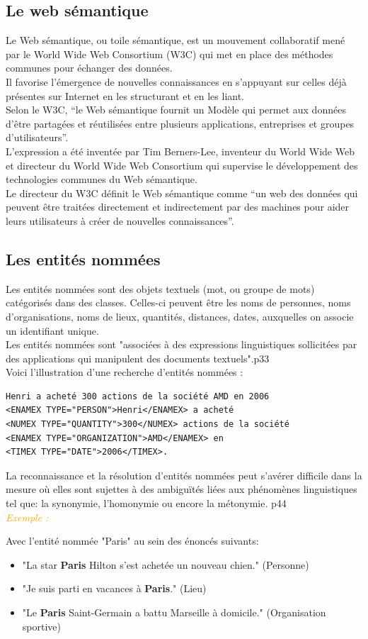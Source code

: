 \documentclass[a4paper, 11pt]{report}
\newenvironment{exemple}
    {
    \textit{\textcolor{orange}{
    Exemple : \\}}
    }
    {~\\
    }
\begin{document}
\subsection{Le web sémantique}
Le Web sémantique, ou toile sémantique, est un mouvement collaboratif mené par le World Wide Web Consortium (W3C) qui met en place des méthodes communes pour échanger des données.\\
Il favorise l'émergence de nouvelles connaissances en s'appuyant sur celles déjà présentes sur Internet en les structurant et en les liant.\\
Selon le W3C, ``le Web sémantique fournit un Modèle qui permet aux données d'être partagées et réutilisées entre plusieurs applications, entreprises et groupes d'utilisateurs''.\\
L'expression a été inventée par Tim Berners-Lee, inventeur du World Wide Web et directeur du World Wide Web Consortium qui supervise le développement des technologies communes du Web sémantique. \\
Le directeur du W3C définit le Web sémantique comme ``un web des données qui peuvent être traitées directement et indirectement par des machines pour aider leurs utilisateurs à créer de nouvelles connaissances''.\cite{W1}

\subsection{Les entités nommées}
Les entités nommées sont des objets textuels (mot, ou groupe de mots) catégorisés dans des classes. Celles-ci peuvent être les noms de personnes, noms d'organisations, noms de lieux, quantités, distances, dates, auxquelles on associe un identifiant unique.\cite{W2}\\
Les entités nommées sont "associées à des expressions linguistiques sollicitées par des applications qui manipulent des documents textuels".p33 \cite{DN12}\\
Voici l'illustration d'une recherche d'entités nommées :
\begin{verbatim}
Henri a acheté 300 actions de la société AMD en 2006
<ENAMEX TYPE="PERSON">Henri</ENAMEX> a acheté 
<NUMEX TYPE="QUANTITY">300</NUMEX> actions de la société 
<ENAMEX TYPE="ORGANIZATION">AMD</ENAMEX> en 
<TIMEX TYPE="DATE">2006</TIMEX>.
\end{verbatim}
La reconnaissance et la résolution d'entités nommées peut s'avérer difficile dans la mesure où elles sont sujettes à des ambiguïtés liées aux phénomènes linguistiques tel que: la synonymie, l'homonymie ou encore la métonymie. p44\cite{DN12}\\
\begin{exemple}
Avec l’entité nommée "Paris" au sein des énoncés suivants:
\begin{itemize}
\item "La star \textbf{Paris} Hilton s'est achetée un nouveau chien." (Personne)
\item "Je suis parti en vacances à \textbf{Paris}." (Lieu)
\item "Le \textbf{Paris} Saint-Germain a battu Marseille à domicile." (Organisation sportive)
\end{itemize}
\end{exemple}
\end{document}
